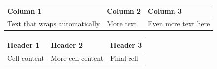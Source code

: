 \documentclass{article}
\begin{document}
\begin{tabularx}{\textwidth}{ |X|X|X| }
\hline
Column 1 & Column 2 & Column 3 \\
\hline
Text that wraps automatically & More text & Even more text here \\
\hline
\end{tabularx}

\begin{tabularx}{0.8\textwidth}{ X X X }
\toprule
Header 1 & Header 2 & Header 3 \\
\midrule
Cell content & More cell content & Final cell \\
\bottomrule
\end{tabularx}
\end{document}
